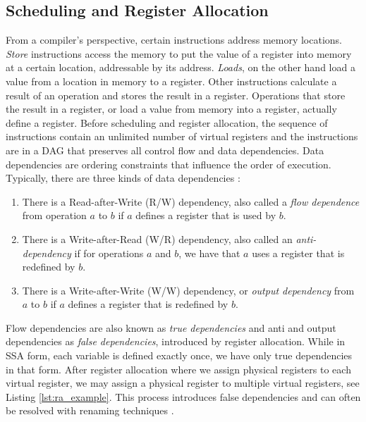 

\subsection{Scheduling and Register Allocation}\label{sec:scheduling_and_ra}
From a compiler's perspective, certain instructions address memory locations. \emph{Store} instructions access the memory to put the value of a register into memory at a certain location, addressable by its address. \emph{Loads}, on the other hand load a value from a location in memory to a register. Other instructions calculate a result of an operation and stores the result in a register. Operations that store the result in a register, or load a value from memory into a register, actually define a register. Before scheduling and register allocation, the sequence of instructions contain an unlimited number of virtual registers and the instructions are in a DAG that preserves all control flow and data dependencies. Data dependencies are ordering constraints that influence the order of execution. Typically, there are three kinds of data dependencies \cite{data_dependece}:
\begin{enumerate}
\item There is a Read-after-Write (R/W) dependency, also called a \emph{flow dependence} from operation $a$ to $b$ if $a$ defines a register that is used by $b$.
\item  There is a Write-after-Read (W/R) dependency, also called an \emph{anti-dependency} if for operations $a$ and $b$, we have that $a$ uses a register that is redefined by $b$. 
\item There is a Write-after-Write (W/W) dependency, or \emph{output dependency} from $a$ to $b$ if $a$ defines a register that is redefined by $b$.
\end{enumerate} 
Flow dependencies are also known as \emph{true dependencies} and anti and output dependencies as \emph{false dependencies}, introduced by register allocation. While in SSA form, each variable is defined exactly once, we have only true dependencies in that form. After register allocation where we assign physical registers to each virtual register, we may assign a physical register to multiple virtual registers, see Listing \ref{lst:ra_example}. This process introduces false dependencies and can often be resolved with renaming techniques \cite{renaming}. 

